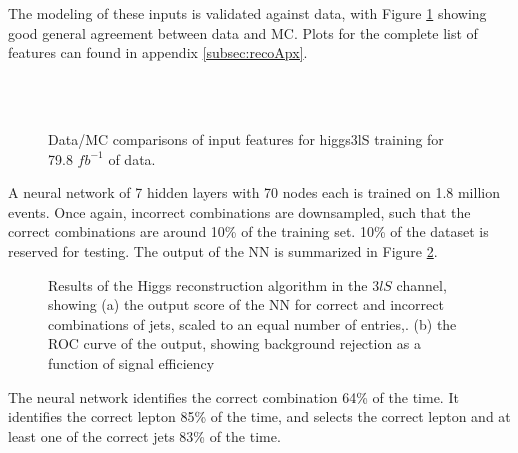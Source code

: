 The modeling of these inputs is validated against data, with Figure \ref{fig:model_higgs3lS} showing good general agreement between data and MC. Plots for the complete list of features can found in appendix \ref{subsec:recoApx}.

\begin{figure}[H]
    \centering
    \\
    \\
    \caption{Data/MC comparisons of input features for higgs3lS training for 79.8 $fb^{-1}$ of data.}
    \label{fig:model_higgs3lS}
\end{figure} 

A neural network of 7 hidden layers with 70 nodes each is trained on 1.8 million events. Once again, incorrect combinations are downsampled, such that the correct combinations are around 10\% of the training set. 10\% of the dataset is reserved for testing. The output of the NN is summarized in Figure \ref{fig:higgs3lSresults}.

\begin{figure}[H]
    \centering
  \label{fig:higgs3lSresults}
  \caption{Results of the Higgs reconstruction algorithm in the $3lS$ channel, showing (a) the output score of the NN for correct and incorrect combinations of jets, scaled to an equal number of entries,. (b) the ROC curve of the output, showing background rejection as a function of signal efficiency}
\end{figure} 

The neural network identifies the correct combination 64\% of the time. It identifies the correct lepton 85\% of the time, and selects the correct lepton and at least one of the correct jets 83\% of the time.


